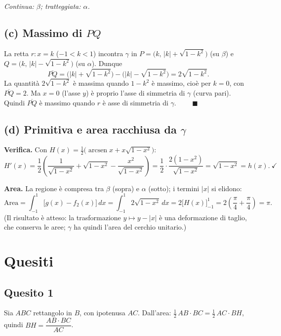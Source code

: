 \documentclass[11pt]{article}
\DeclareMathOperator{\arcsen}{arcsen}
\begin{document}
\emph{Continua: $\beta$; tratteggiata: $\alpha$.}

\subsection*{(c) Massimo di \texorpdfstring{$PQ$}{PQ}}

La retta $r\colon x=k$ ($-1<k<1$) incontra $\gamma$ in
$P=\bigl(k,\,|k|+\sqrt{1-k^2}\bigr)$ (su $\beta$) e
$Q=\bigl(k,\,|k|-\sqrt{1-k^2}\bigr)$ (su $\alpha$). Dunque
\[
\overline{PQ}=\bigl(|k|+\sqrt{1-k^2}\bigr)-\bigl(|k|-\sqrt{1-k^2}\bigr)=2\sqrt{1-k^2}.
\]
La quantit\`a $2\sqrt{1-k^2}$ \`e massima quando $1-k^2$ \`e massimo, cio\`e per
$k=0$, con $\overline{PQ}=2$. Ma $x=0$ (l'asse $y$) \`e proprio l'asse di simmetria
di $\gamma$ (curva pari). Quindi $\overline{PQ}$ \`e massimo quando $r$ \`e asse di
simmetria di $\gamma$. $\qquad\blacksquare$

\subsection*{(d) Primitiva e area racchiusa da \texorpdfstring{$\gamma$}{gamma}}

\textbf{Verifica.} Con $H(x)=\tfrac12\bigl(\arcsen x+x\sqrt{1-x^2}\bigr)$:
\[
H'(x)=\frac12\!\left(\frac{1}{\sqrt{1-x^2}}+\sqrt{1-x^2}-\frac{x^2}{\sqrt{1-x^2}}\right)
=\frac12\cdot\frac{2(1-x^2)}{\sqrt{1-x^2}}=\sqrt{1-x^2}=h(x).\ \checkmark
\]

\textbf{Area.} La regione \`e compresa tra $\beta$ (sopra) e $\alpha$ (sotto); i
termini $|x|$ si elidono:
\[
\text{Area}=\int_{-1}^{1}\bigl[g(x)-f_2(x)\bigr]\,dx
=\int_{-1}^{1}2\sqrt{1-x^2}\,dx
=2\bigl[H(x)\bigr]_{-1}^{1}
=2\!\left(\frac{\pi}{4}+\frac{\pi}{4}\right)=\boxed{\pi.}
\]
(Il risultato \`e atteso: la trasformazione $y\mapsto y-|x|$ \`e una deformazione di
taglio, che conserva le aree; $\gamma$ ha quindi l'area del cerchio unitario.)

\newpage

\section*{Quesiti}

\subsection*{Quesito 1}

Sia $ABC$ rettangolo in $B$, con ipotenusa $AC$. Dall'area:
$\tfrac12\,AB\cdot BC=\tfrac12\,AC\cdot BH$, quindi $BH=\dfrac{AB\cdot BC}{AC}$.
\end{document}

